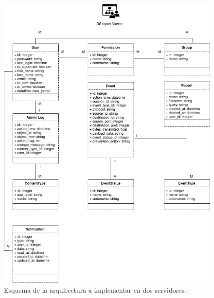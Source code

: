 \begin{figure}
	\centering
	\includegraphics[scale=.6]{images/Diagrama_de_objetos}
	\caption{Esquema de la arquitectura a implementar en dos servidores.}
	\label{fig:ids_doos}
\end{figure}

